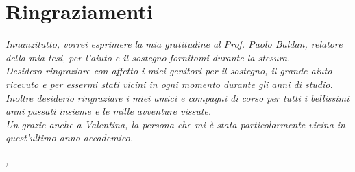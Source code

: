
\cleardoublepage
{}
{}
\bigskip

\begingroup
\let\clearpage\relax
\let\cleardoublepage\relax
\let\cleardoublepage\relax

\chapter*{Ringraziamenti}

\noindent \textit{Innanzitutto, vorrei esprimere la mia gratitudine al Prof. Paolo Baldan, relatore della mia tesi, per l'aiuto e il sostegno fornitomi durante la stesura.}\\

\noindent \textit{Desidero ringraziare con affetto i miei genitori per il sostegno, il grande aiuto ricevuto e per essermi stati vicini in ogni momento durante gli anni di studio.}\\

\noindent \textit{Inoltre desiderio ringraziare i miei amici e compagni di corso per tutti i bellissimi anni passati insieme e le mille avventure vissute.}\\

\noindent \textit{Un grazie anche a Valentina, la persona che mi è stata particolarmente vicina in quest'ultimo anno accademico.}
\bigskip

\noindent\textit{\myLocation, \myTime}
\hfill \myName

\endgroup

